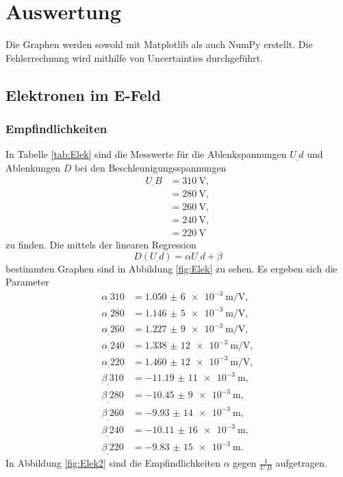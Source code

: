 \section{Auswertung}
\label{sec:Auswertung}


Die Graphen werden sowohl mit Matplotlib \cite{matplotlib} als auch NumPy \cite{numpy} erstellt. Die Fehlerrechnung wird mithilfe von Uncertainties \cite{uncertainties} durchgeführt.

\subsection{Elektronen im E-Feld}
\subsubsection{Empfindlichkeiten}
\label{sec:empf}
In Tabelle \ref{tab:Elek} sind die Messwerte für die Ablenkspannungen $U_.d$ und Ablenkungen $D$ bei den Beschleunigungsspannungen
\begin{align*}
U_.B&=\SI{310}{\volt},\\
&=\SI{280}{\volt},\\
&=\SI{260}{\volt},\\
&=\SI{240}{\volt},\\
&=\SI{220}{\volt}
\end{align*}
zu finden. Die mittels der linearen Regression \[D(U_.d)=\alpha U_.d + \beta\] bestimmten Graphen sind in Abbildung \ref{fig:Elek} zu sehen.
Es ergeben sich die Parameter
\begin{align*}
\alpha_.{310}&=\SI{1,050(6)e-3}{\metre\per\volt},\\
\alpha_.{280}&=\SI{1,146(5)e-3}{\metre\per\volt},\\
\alpha_.{260}&=\SI{1,227(9)e-3}{\metre\per\volt},\\
\alpha_.{240}&=\SI{1,338(12)e-3}{\metre\per\volt},\\
\alpha_.{220}&=\SI{1,460(12)e-3}{\metre\per\volt},\\
\beta_.{310}&=\SI{-11,19(11)e-3}{\metre},\\
\beta_.{280}&=\SI{-10,45(9)e-3}{\metre},\\
\beta_.{260}&=\SI{-9,93(14)e-3}{\metre},\\
\beta_.{240}&=\SI{-10,11(16)e-3}{\metre},\\
\beta_.{220}&=\SI{-9,83(15)e-3}{\metre}\text{.}
\end{align*}
In Abbildung \ref{fig:Elek2} sind die Empfindlichkeiten $\alpha$ gegen $\frac{1}{U_.B}$ aufgetragen.
